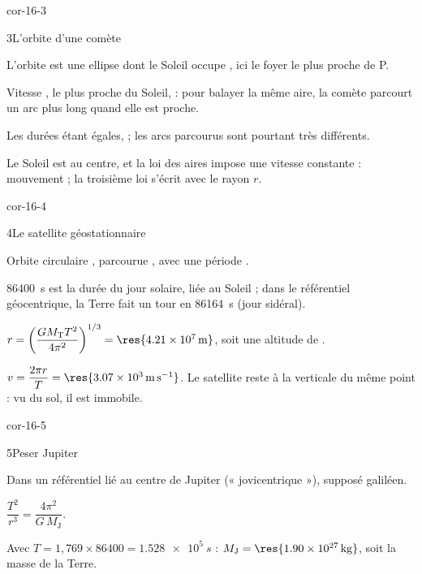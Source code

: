 \begin{blocLivre}{cor-16-3}
\begin{corrige}{3}{L'orbite d'une comète}
\begin{questions}
\item L'orbite est une ellipse dont le Soleil occupe , ici le foyer le plus proche de P.
\item Vitesse , le plus proche du Soleil,  : pour
balayer la même aire, la comète parcourt un arc plus long quand elle est proche.
\item Les durées étant égales,  ; les arcs parcourus sont pourtant très différents.
\item Le Soleil est au centre, et la loi des aires impose une vitesse constante : mouvement  ;
la troisième loi s'écrit avec le rayon $r$.
\end{questions}
\end{corrige}
\end{blocLivre}
\begin{blocLivre}{cor-16-4}
\begin{corrige}{4}{Le satellite géostationnaire}
\begin{questions}
\item Orbite circulaire , parcourue ,
avec une période .
\item \qty{86400}{s} est la durée du jour solaire, liée au Soleil ; dans le référentiel géocentrique, la Terre fait un tour en
\qty{86164}{s} (jour sidéral).
\item $r=\left(\dfrac{GM_\mathrm{T}T^2}{4\pi^2}\right)^{1/3}=\res{\qty{4,21e7}{m}}$, soit une altitude de .
\item $v=\dfrac{2\pi r}{T}=\res{\qty{3,07e3}{m.s^{-1}}}$. Le satellite reste à la verticale du même point : vu du sol, il est
immobile.
\end{questions}
\end{corrige}
\end{blocLivre}
\begin{blocLivre}{cor-16-5}
\begin{corrige}{5}{Peser Jupiter}
\begin{questions}
\item Dans un référentiel lié au centre de Jupiter (« jovicentrique »), supposé galiléen.
\item $\dfrac{T^2}{r^3}=\dfrac{4\pi^2}{G\,M_\mathrm{J}}$.
\item Avec $T=1{,}769\times86400=\qty{1,528e5}{s}$ : $M_\mathrm{J}=\res{\qty{1,90e27}{kg}}$, soit  la masse de la Terre.
\end{questions}
\end{corrige}
\end{blocLivre}
